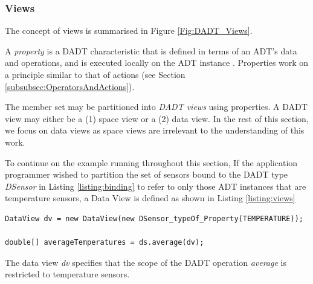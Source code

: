 \subsubsection{Views} \label{subsubsec:views}

The concept of views is summarised in Figure \ref{Fig:DADT_Views}.

A \emph{property} is a DADT characteristic that is defined in terms of an ADT's
data and operations, and is executed locally on the ADT instance
\cite{migliavacca_DADT:2006}. Properties work on a principle similar to that of
actions (see Section \ref{subsubsec:OperatorsAndActions}).

The member set may be partitioned into \emph{DADT views} using properties. A
DADT view may either be a (1) space view or a (2) data view. In the rest of this
section, we focus on data views as space views are irrelevant to the
understanding of this work. 

To continue on the example running throughout this section, If the application
programmer wished to partition the set of sensors bound to the DADT type
\emph{DSensor} in Listing \ref{listing:binding} to refer to only those ADT
instances that are temperature sensors, a Data View is defined as shown in Listing
\ref{listing:views} 
  
\begin{lstlisting}[frame=trbl, basewidth={0.55em, 0.6em}, captionpos=b, 
basicstyle=\ttfamily\footnotesize, breaklines, caption = Definition and use of DADT Data View, label = listing:views ]  
DataView dv = new DataView(new DSensor_typeOf_Property(TEMPERATURE));

double[] averageTemperatures = ds.average(dv);
\end{lstlisting}

The data view \emph{dv} specifies that the scope of the DADT operation
\emph{average} is restricted to temperature sensors.

